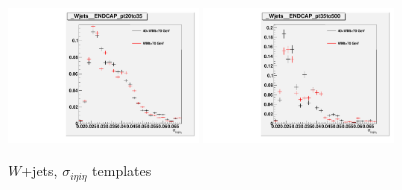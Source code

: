\begin{figure}[htb]
\begin{center}
  \includegraphics[width=0.45\textwidth]{../figs/figs_v11/ChannelsMERGED_WGamma/QuickChecks/cTemplatesVsWMt_Wjets_phoSigmaIEtaIEta_ENDCAP_pt20to35.pdf} \includegraphics[width=0.45\textwidth]{../figs/figs_v11/ChannelsMERGED_WGamma/QuickChecks/cTemplatesVsWMt_Wjets_phoSigmaIEtaIEta_ENDCAP_pt35to500.pdf}\\
  \caption{$W$+jets, $\sigma_{i \eta i \eta}$ templates}
  \label{fig:templatesVsWMt_Wjets_SIHIH}
  \end{center}
\end{figure}


